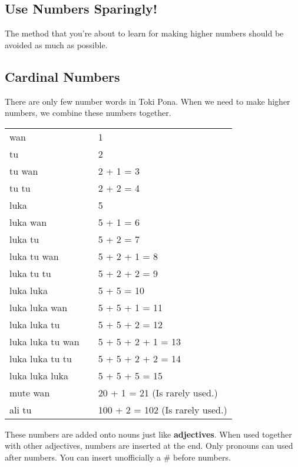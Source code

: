 \subsection*{Use Numbers Sparingly!}
%
The method that you're about to learn for making higher numbers should be avoided as much as possible. 
%
\subsection*{Cardinal Numbers}
%
There are only few number words in Toki Pona.
When we need to make higher numbers, we combine these numbers together. 

\begin{supertabular}{p{5,5cm}|ll}
wan && 1 \\ 
tu  && 2 \\ 
tu wan && 2 + 1 = 3 \\
tu tu && 2 + 2 = 4 \\
luka && 5 \\
luka wan && 5 + 1 = 6 \\
luka tu && 5 + 2 = 7 \\
luka tu wan && 5 + 2 + 1 = 8 \\
luka tu tu && 5 + 2 + 2 = 9 \\
luka luka && 5 + 5 = 10 \\
luka luka wan && 5 + 5 + 1 = 11 \\
luka luka tu && 5 + 5 + 2 = 12 \\
luka luka tu wan && 5 + 5 + 2 + 1 = 13 \\
luka luka tu tu && 5 + 5 + 2 + 2 = 14 \\
luka luka luka && 5 + 5 + 5 = 15 \\
mute wan && 20 + 1 = 21 (Is rarely used.) \\
ali tu && 100 + 2 = 102 (Is rarely used.) \\
\end{supertabular} 

These numbers are added onto nouns just like \textbf{adjectives}. 
When used together with other adjectives, numbers are inserted at the end.
Only pronouns can used after numbers.
You can insert unofficially a \# before numbers. 

